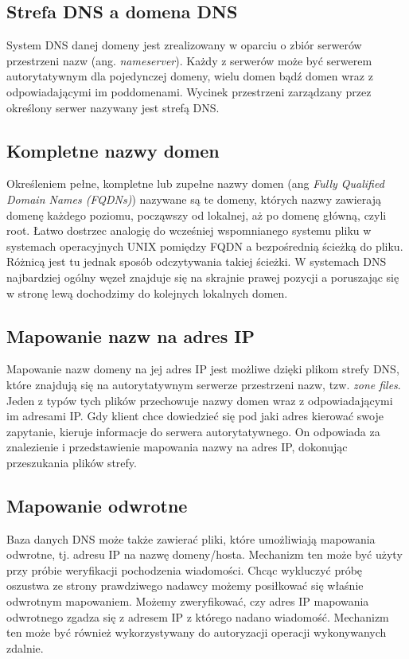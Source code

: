 \subsection{Strefa DNS a domena DNS}
System DNS danej domeny jest zrealizowany w oparciu o zbiór serwerów przestrzeni nazw (ang. \textit{nameserver}). Każdy z serwerów
może być serwerem autorytatywnym dla pojedynczej domeny, wielu domen bądź domen wraz z odpowiadającymi im poddomenami. Wycinek
przestrzeni zarządzany przez określony serwer nazywany jest strefą DNS.


\subsection{Kompletne nazwy domen}
\label{sec:FQDN}
Określeniem pełne, kompletne lub zupełne nazwy domen (ang \textit{Fully Qualified Domain Names (FQDNs)}) nazywane są te domeny,
których nazwy zawierają domenę każdego poziomu, począwszy od lokalnej, aż po domenę główną, czyli root. Łatwo dostrzec analogię
do wcześniej wspomnianego systemu pliku w systemach operacyjnych UNIX pomiędzy FQDN a bezpośrednią ścieżką do pliku. Różnicą jest
tu jednak sposób odczytywania takiej ścieżki. W systemach DNS najbardziej ogólny węzeł znajduje się na skrajnie prawej pozycji a
poruszając się w stronę lewą dochodzimy do kolejnych lokalnych domen.

\subsection{Mapowanie nazw na adres IP}
\label{mapping}
Mapowanie nazw domeny na jej adres IP jest możliwe dzięki plikom strefy DNS, które znajdują się na autorytatywnym serwerze
przestrzeni nazw, tzw. \textit{zone files}. Jeden z typów tych plików przechowuje nazwy domen wraz z odpowiadającymi im adresami
IP. Gdy klient chce dowiedzieć się pod jaki adres kierować swoje zapytanie, kieruje informacje do serwera autorytatywnego. On
odpowiada za znalezienie i przedstawienie mapowania nazwy na adres IP, dokonując przeszukania plików strefy.

\subsection{Mapowanie odwrotne}
\label{revmapping}
Baza danych DNS może także zawierać pliki, które umożliwiają mapowania odwrotne, tj. adresu IP na nazwę domeny/hosta. Mechanizm ten
może być użyty przy próbie weryfikacji pochodzenia wiadomości. Chcąc wykluczyć próbę oszustwa ze strony prawdziwego nadawcy możemy
posiłkować się właśnie odwrotnym mapowaniem. Możemy zweryfikować, czy adres IP mapowania odwrotnego zgadza się z adresem IP z którego
nadano wiadomość. Mechanizm ten może być również wykorzystywany do autoryzacji operacji wykonywanych zdalnie.


